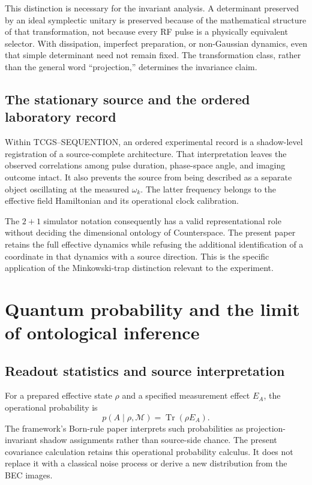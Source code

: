 \documentclass[11pt,a4paper]{article}
\theoremstyle{definition}
\theoremstyle{remark}
\newcommand{\TCGS}{TCGS--SEQUENTION}
\newcommand{\Tr}{\operatorname{Tr}}
\begin{document}
This distinction is necessary for the invariant analysis. A determinant preserved by an ideal symplectic unitary is preserved because of the mathematical structure of that transformation, not because every RF pulse is a physically equivalent selector. With dissipation, imperfect preparation, or non-Gaussian dynamics, even that simple determinant need not remain fixed. The transformation class, rather than the general word ``projection,'' determines the invariance claim.\cite{weedbrook,foundation}

\subsection{The stationary source and the ordered laboratory record}
Within \TCGS, an ordered experimental record is a shadow-level registration of a source-complete architecture. That interpretation leaves the observed correlations among pulse duration, phase-space angle, and imaging outcome intact. It also prevents the source from being described as a separate object oscillating at the measured $\omega_k$. The latter frequency belongs to the effective field Hamiltonian and its operational clock calibration.\cite{foundation,logical}

The $2+1$ simulator notation consequently has a valid representational role without deciding the dimensional ontology of Counterspace. The present paper retains the full effective dynamics while refusing the additional identification of a coordinate in that dynamics with a source direction. This is the specific application of the Minkowski-trap distinction relevant to the experiment.\cite{minkowski,foundation}

\section{Quantum probability and the limit of ontological inference}
\label{sec:probability}
\subsection{Readout statistics and source interpretation}
For a prepared effective state $\rho$ and a specified measurement effect $E_A$, the operational probability is
\begin{equation}
 p(A\mid\rho,\mathcal M)=\Tr(\rho E_A).
 \label{eq:born_effect}
\end{equation}
The framework's Born-rule paper interprets such probabilities as projection-invariant shadow assignments rather than source-side chance. The present covariance calculation retains this operational probability calculus. It does not replace it with a classical noise process or derive a new distribution from the BEC images.\cite{born,foundation}
\end{document}
